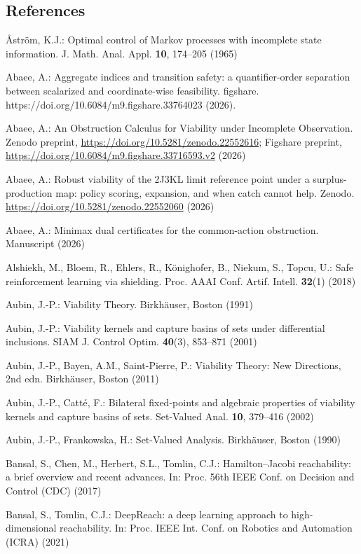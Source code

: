 \documentclass[10pt,twocolumn]{article}
\theoremstyle{definition}
\begin{document}
\subsection{References}\label{references}
{\footnotesize

\r{A}str\"om, K.J.: Optimal control of Markov processes with incomplete state information. J. Math. Anal. Appl. \textbf{10}, 174--205 (1965)

Abaee, A.: Aggregate indices and transition safety: a quantifier-order separation between scalarized and coordinate-wise feasibility. figshare. https://doi.org/10.6084/m9.figshare.33764023 (2026).

Abaee, A.: An Obstruction Calculus for Viability under Incomplete Observation. Zenodo preprint, \url{https://doi.org/10.5281/zenodo.22552616}; Figshare preprint, \url{https://doi.org/10.6084/m9.figshare.33716593.v2} (2026)

Abaee, A.: Robust viability of the 2J3KL limit reference point under a surplus-production map: policy scoring, expansion, and when catch cannot help. Zenodo. \url{https://doi.org/10.5281/zenodo.22552060} (2026)

Abaee, A.: Minimax dual certificates for the common-action obstruction. Manuscript (2026)

Alshiekh, M., Bloem, R., Ehlers, R., K\"onighofer, B., Niekum, S., Topcu, U.: Safe reinforcement learning via shielding. Proc. AAAI Conf. Artif. Intell. \textbf{32}(1) (2018)

Aubin, J.-P.: Viability Theory. Birkh\"auser, Boston (1991)

Aubin, J.-P.: Viability kernels and capture basins of sets under differential inclusions. SIAM J. Control Optim. \textbf{40}(3), 853--871 (2001)

Aubin, J.-P., Bayen, A.M., Saint-Pierre, P.: Viability Theory: New Directions, 2nd edn. Birkh\"auser, Boston (2011)

Aubin, J.-P., Catt\'e, F.: Bilateral fixed-points and algebraic properties of viability kernels and capture basins of sets. Set-Valued Anal. \textbf{10}, 379--416 (2002)

Aubin, J.-P., Frankowska, H.: Set-Valued Analysis. Birkh\"auser, Boston (1990)

Bansal, S., Chen, M., Herbert, S.L., Tomlin, C.J.: Hamilton--Jacobi reachability: a brief overview and recent advances. In: Proc. 56th IEEE Conf. on Decision and Control (CDC) (2017)

Bansal, S., Tomlin, C.J.: DeepReach: a deep learning approach to high-dimensional reachability. In: Proc. IEEE Int. Conf. on Robotics and Automation (ICRA) (2021)

}
\end{document}
